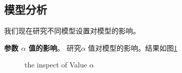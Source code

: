 \documentclass[lang=cn,11pt]{elegantpaper}
\begin{document}
\subsection{模型分析}

我们现在研究不同模型设置对模型的影响。

\textbf{参数 $ \alpha $ 值的影响}。 研究$ \alpha $ 值对模型的影响。结果如图\ref{fig:alpha}
\begin{figure}[htbp]
	\centering
	\quad
	\quad
	\quad
	\caption{ the inspect of Value $ \alpha $\label{fig:alpha}} 
\end{figure}
\end{document}
